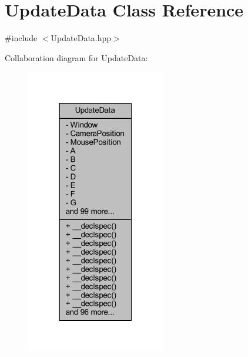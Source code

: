 \hypertarget{class_update_data}{\section{Update\-Data Class Reference}
\label{class_update_data}
}


{\ttfamily \#include $<$Update\-Data.\-hpp$>$}



Collaboration diagram for Update\-Data\-:\nopagebreak
\begin{figure}[H]
\begin{center}
\leavevmode
\includegraphics[width=172pt]{class_update_data__coll__graph}
\end{center}
\end{figure}
